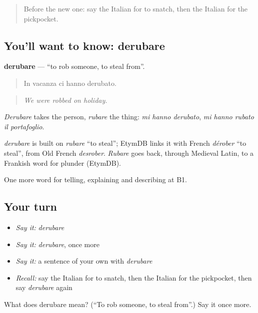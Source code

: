 \begin{quote}
Before the new one: say the Italian for to snatch, then the Italian for the pickpocket.
\end{quote}

\subsection*{You'll want to know: derubare}
\textbf{derubare} — \textquotedblleft{}to rob someone, to steal from\textquotedblright{}.

\begin{quote}
In vacanza ci hanno derubato.
\end{quote}

\begin{quote}
\emph{We were robbed on holiday.}
\end{quote}

\emph{Derubare} takes the person, \emph{rubare} the thing: \emph{mi hanno derubato}, \emph{mi hanno rubato il portafoglio}.

\begin{cousinweb}
\emph{derubare} is built on \emph{rubare} \textquotedblleft{}to steal\textquotedblright{}; EtymDB links it with French \emph{dérober} \textquotedblleft{}to steal\textquotedblright{}, from Old French \emph{desrober}. \emph{Rubare} goes back, through Medieval Latin, to a Frankish word for plunder (EtymDB).
\end{cousinweb}

\begin{grammarlens}[title={What you've built}]
One more word for telling, explaining and describing at B1.
\end{grammarlens}

\subsection*{Your turn}
\begin{itemize}
\raggedright
  \item \emph{Say it:} \emph{derubare}
  \item \emph{Say it:} \emph{derubare}, once more
  \item \emph{Say it:} a sentence of your own with \emph{derubare}
  \item \emph{Recall:} say the Italian for to snatch, then the Italian for the pickpocket, then say \emph{derubare} again
\end{itemize}

\begin{tcolorbox}[breakable,colback=teal!4,colframe=teal!35!black,title={Before you move on}]
What does derubare mean? (\textquotedblleft{}To rob someone, to steal from\textquotedblright{}.) Say it once more.
\end{tcolorbox}
